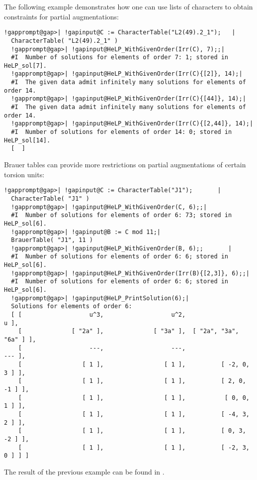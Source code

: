 \documentclass[a4paper,11pt]{report}
\begin{document}
{{ The following example demonstrates how one can use lists of characters to
obtain constraints for partial augmentations: 
\begin{Verbatim}[commandchars=!@|,fontsize=\small,frame=single,label=Example]
  !gapprompt@gap>| !gapinput@C := CharacterTable("L2(49).2_1");   |
  CharacterTable( "L2(49).2_1" )
  !gapprompt@gap>| !gapinput@HeLP_WithGivenOrder(Irr(C), 7);;|
  #I  Number of solutions for elements of order 7: 1; stored in HeLP_sol[7].
  !gapprompt@gap>| !gapinput@HeLP_WithGivenOrder(Irr(C){[2]}, 14);|
  #I  The given data admit infinitely many solutions for elements of order 14.
  !gapprompt@gap>| !gapinput@HeLP_WithGivenOrder(Irr(C){[44]}, 14);|
  #I  The given data admit infinitely many solutions for elements of order 14.
  !gapprompt@gap>| !gapinput@HeLP_WithGivenOrder(Irr(C){[2,44]}, 14);|
  #I  Number of solutions for elements of order 14: 0; stored in HeLP_sol[14].
  [  ]
\end{Verbatim}
 Brauer tables can provide more restrictions on partial augmentations of
certain torsion units: 
\begin{Verbatim}[commandchars=!@|,fontsize=\small,frame=single,label=Example]
  !gapprompt@gap>| !gapinput@C := CharacterTable("J1");       |
  CharacterTable( "J1" )
  !gapprompt@gap>| !gapinput@HeLP_WithGivenOrder(C, 6);;|
  #I  Number of solutions for elements of order 6: 73; stored in HeLP_sol[6].
  !gapprompt@gap>| !gapinput@B := C mod 11;|
  BrauerTable( "J1", 11 )
  !gapprompt@gap>| !gapinput@HeLP_WithGivenOrder(B, 6);;       |
  #I  Number of solutions for elements of order 6: 6; stored in HeLP_sol[6].
  !gapprompt@gap>| !gapinput@HeLP_WithGivenOrder(Irr(B){[2,3]}, 6);;|
  #I  Number of solutions for elements of order 6: 6; stored in HeLP_sol[6].
  !gapprompt@gap>| !gapinput@HeLP_PrintSolution(6);|
  Solutions for elements of order 6:
  [ [                   u^3,                   u^2,                     u ],
    [              [ "2a" ],              [ "3a" ],  [ "2a", "3a", "6a" ] ],
    [                   ---,                   ---,                   --- ],
    [                 [ 1 ],                 [ 1 ],          [ -2, 0, 3 ] ],
    [                 [ 1 ],                 [ 1 ],          [ 2, 0, -1 ] ],
    [                 [ 1 ],                 [ 1 ],           [ 0, 0, 1 ] ],
    [                 [ 1 ],                 [ 1 ],          [ -4, 3, 2 ] ],
    [                 [ 1 ],                 [ 1 ],          [ 0, 3, -2 ] ],
    [                 [ 1 ],                 [ 1 ],          [ -2, 3, 0 ] ] ]
\end{Verbatim}
 The result of the previous example can be found in \cite{BJK}. 

}}
\end{document}
